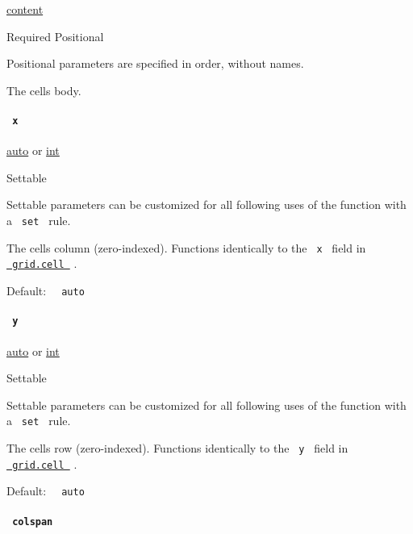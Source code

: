 \href{/docs/reference/foundations/content/}{content}

{Required} {{ Positional }}

\label{definitions-cell-body-positional-tooltip}
Positional parameters are specified in order, without names.

The cell\textquotesingle s body.

\paragraph{\texorpdfstring{\texttt{\ x\ }}{ x }}\label{definitions-cell-x}

\href{/docs/reference/foundations/auto/}{auto} {or}
\href{/docs/reference/foundations/int/}{int}

{{ Settable }}

\label{definitions-cell-x-settable-tooltip}
Settable parameters can be customized for all following uses of the
function with a \texttt{\ set\ } rule.

The cell\textquotesingle s column (zero-indexed). Functions identically
to the \texttt{\ x\ } field in
\href{/docs/reference/layout/grid/\#definitions-cell}{\texttt{\ grid.cell\ }}
.

Default: \texttt{\ }{\texttt{\ auto\ }}\texttt{\ }

\paragraph{\texorpdfstring{\texttt{\ y\ }}{ y }}\label{definitions-cell-y}

\href{/docs/reference/foundations/auto/}{auto} {or}
\href{/docs/reference/foundations/int/}{int}

{{ Settable }}

\label{definitions-cell-y-settable-tooltip}
Settable parameters can be customized for all following uses of the
function with a \texttt{\ set\ } rule.

The cell\textquotesingle s row (zero-indexed). Functions identically to
the \texttt{\ y\ } field in
\href{/docs/reference/layout/grid/\#definitions-cell}{\texttt{\ grid.cell\ }}
.

Default: \texttt{\ }{\texttt{\ auto\ }}\texttt{\ }

\paragraph{\texorpdfstring{\texttt{\ colspan\ }}{ colspan }}\label{definitions-cell-colspan}

